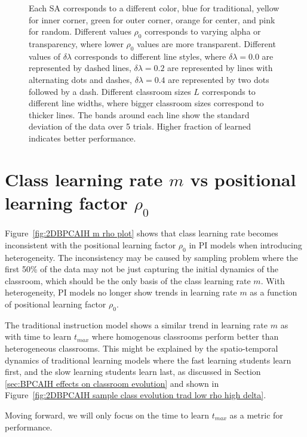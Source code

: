 \begin{figure}[htbp!]
{   Each SA corresponds to a different color, blue for traditional, yellow for inner corner, green for outer corner, orange for center, and pink for random. 
   Different values $\rho_0$ corresponds to varying alpha or transparency, where lower $\rho_0$ values are more transparent.
   Different values of $\delta\lambda$ corresponds to different line styles, where $\delta\lambda=0.0$ are represented by dashed lines, $\delta\lambda=0.2$ are represented by lines with alternating dots and dashes, $\delta\lambda=0.4$ are represented by two dots followed by a dash.
   Different classroom sizes $L$ corresponds to different line widths, where bigger classroom sizes correspond to thicker lines.
   The bands around each line show the standard deviation of the data over 5 trials.
   Higher fraction of learned indicates better performance.
   }
   \label{fig:2DBPCAIH t-learned comparisons}
\end{figure}

\newpage %

\section{Class learning rate $m$ vs positional learning factor $\rho_0$}\label{sec:BPCAIH m vs rho}

Figure~\ref{fig:2DBPCAIH m rho plot} shows that class learning rate becomes inconsistent with the positional learning factor $\rho_0$ in PI models when introducing heterogeneity. 
The inconsistency may be caused by sampling problem where the first 50\% of the data may not be just capturing the initial dynamics of the classroom, which should be the only basis of the class learning rate $m$.
With heterogeneity, PI models no longer show trends in learning rate $m$ as a function of positional learning factor $\rho_0$.

The traditional instruction model shows a similar trend in learning rate $m$ as with time to learn $t_{max}$ where homogenous classrooms perform better than heterogeneous classrooms.
This might be explained by the spatio-temporal dynamics of traditional learning models where the fast learning students learn first, and the slow learning students learn last, as discussed in Section \ref{sec:BPCAIH effects on classroom evolution} and shown in Figure~\ref{fig:2DBPCAIH sample class evolution trad low rho high delta}.

Moving forward, we will only focus on the time to learn $t_{max}$ as a metric for performance.

